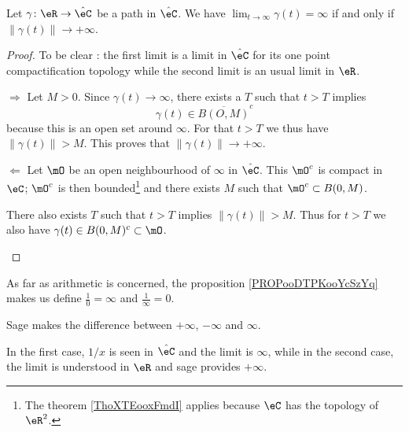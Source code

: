 \begin{proposition}     \label{PROPooDTPKooYcSzYq}
    Let \( \gamma\colon \eR\to \hat \eC\) be a path in \( \hat \eC\). We have \( \lim_{t\to \infty} \gamma(t)=\infty\) if and only if \( \| \gamma(t) \|\to +\infty\).
\end{proposition}

\begin{proof}
    To be clear : the first limit is a limit in \( \hat \eC\) for its one point compactification topology while the second limit is an usual limit in \( \eR\).
    \begin{subproof}
    \item[\( \Rightarrow\)]
        Let \( M>0\). Since \( \gamma(t)\to \infty\), there exists a \( T\) such that \( t>T\) implies 
        \begin{equation}
            \gamma(t)\in\overline{ B(O,M) }^c
        \end{equation}
        because this is an open set around \( \infty\). For that \( t>T\) we thus have \( \| \gamma(t) \|>M\). This proves that \( \| \gamma(t) \|\to +\infty\).
    \item[\( \Leftarrow\)]
        Let \( \mO\) be an open neighbourhood of \( \infty\) in \( \hat \eC\). This \( \mO^c\) is compact in \( \eC\); \( \mO^c\) is then bounded\footnote{The theorem \ref{ThoXTEooxFmdI} applies because \( \eC\) has the topology of \( \eR^2\).} and there exists \( M\) such that \( \mO^c\subset B(0,M)\).

        There also exists \( T\) such that \( t>T\) implies \( \| \gamma(t) \|>M\). Thus for \( t>T\) we also have \( \gamma(t)\in B(0,M)^c\subset \mO\).
    \end{subproof}
\end{proof}

As far as arithmetic is concerned, the proposition \ref{PROPooDTPKooYcSzYq} makes us  define \( \frac{1}{ 0 }=\infty\) and \( \frac{ 1 }{ \infty }=0\). 

\begin{remark}
    
    Sage makes the difference between \( +\infty\), \( -\infty\) and \( \infty\).

    In the first case, \( 1/x\) is seen in \( \hat \eC\) and the limit is \( \infty\), while in the second case, the limit is understood in \( \eR\) and sage provides \( +\infty\).
\end{remark}

